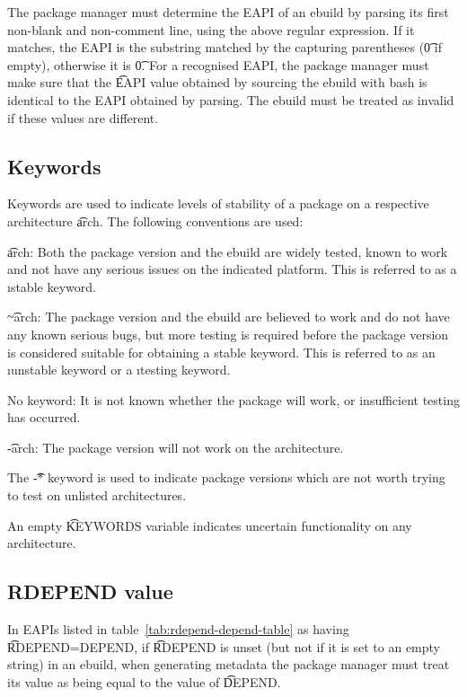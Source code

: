 The package manager must determine the EAPI of an ebuild by parsing its first non-blank and
non-comment line, using the above regular expression. If it matches, the EAPI is the substring
matched by the capturing parentheses (\t{0} if empty), otherwise it is \t{0}. For a recognised
EAPI, the package manager must make sure that the \t{EAPI} value obtained by sourcing the ebuild
with bash is identical to the EAPI obtained by parsing. The ebuild must be treated as invalid if
these values are different.

\subsection{Keywords}
\label{sec:keywords}

Keywords are used to indicate levels of stability of a package on a respective architecture
\t{arch}. The following conventions are used:
\begin{compactitem}
\item \t{arch}: Both the package version and the ebuild are widely tested, known to work and not
    have any serious issues on the indicated platform. This is referred to as a \i{stable keyword}.
\item \t{\textasciitilde arch}: The package version and the ebuild are believed to work and do
    not have any known serious bugs, but more testing is required before the package version is
    considered suitable for obtaining a stable keyword. This is referred to as an \i{unstable
    keyword} or a \i{testing keyword}.
\item No keyword: It is not known whether the package will work, or insufficient testing has
    occurred.
\item \t{-arch}: The package version will not work on the architecture.
\end{compactitem}
The \t{-*} keyword is used to indicate package versions which are not worth trying to test on
unlisted architectures.

An empty \t{KEYWORDS} variable indicates uncertain functionality on any architecture.

\subsection{RDEPEND value}
\label{sec:rdepend-depend}

 In EAPIs listed in table~\ref{tab:rdepend-depend-table} as having
\t{RDEPEND=DEPEND}, if \t{RDEPEND} is unset (but not if it is set to an empty string) in an ebuild,
when generating metadata the package manager must treat its value as being equal to the value of
\t{DEPEND}.


